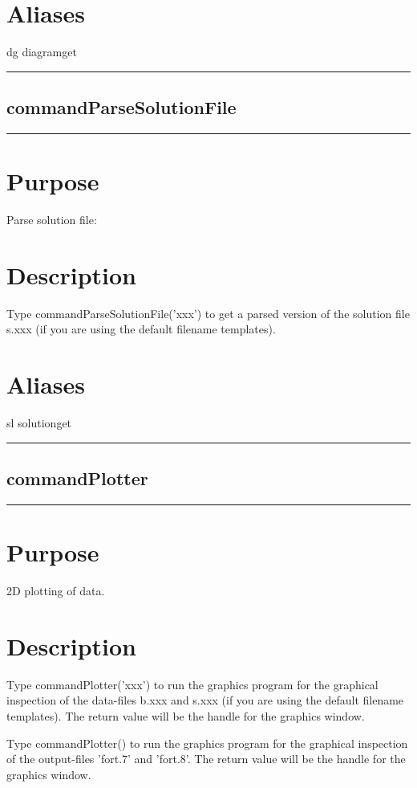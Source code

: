 \documentclass[12pt]{report}
\begin{document}
\begin{minipage}{6in}
    \section*{Aliases}
dg diagramget \medskip\hrule\end{minipage}\subsection{commandParseSolutionFile} \label{sec:clui_ref_commandParseSolutionFile}\begin{minipage}{6in}\hrule\medskip\section*{Purpose}
Parse solution file:\section*{Description}

    Type commandParseSolutionFile('xxx') to get a parsed version of the solution file
    s.xxx (if you are using the default filename templates).
    \section*{Aliases}
sl solutionget \medskip\hrule\end{minipage}\subsection{commandPlotter} \label{sec:clui_ref_commandPlotter}\begin{minipage}{6in}\hrule\medskip\section*{Purpose}
2D plotting of data.\section*{Description}

    Type commandPlotter('xxx') to run the graphics program for the graphical
    inspection of the data-files b.xxx and s.xxx (if you are using the
    default filename templates).  The return value will be the handle
    for the graphics window.

    Type commandPlotter() to run the graphics program for the graphical
    inspection of the output-files 'fort.7' and 'fort.8'.  The return
    value will be the handle for the graphics window.

\end{minipage}
\end{document}
